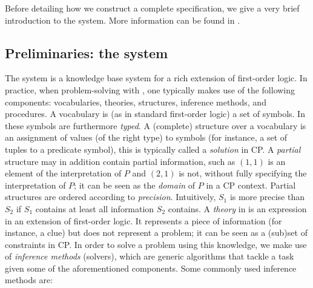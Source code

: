 Before detailing how we construct a complete specification, we give a very brief introduction to the \idp system. More information can be found in . 
\subsection{Preliminaries: the \idp system} 
The \idp system  is a knowledge base system  for a rich extension of first-order logic. 
In practice, when problem-solving with \idp, one typically makes use of the following components: vocabularies, theories, structures, inference methods, and procedures.
A vocabulary is (as in standard first-order logic) a set of symbols. In \idp these symbols are furthermore \emph{typed}. 
A (complete) structure over a vocabulary is an assignment of values (of the right type) to symbols (for instance, a set of tuples to a predicate symbol), this is typically called a \textit{solution} in CP. A \emph{partial} structure may in addition contain partial information, such as $(1,1)$ is an element of the interpretation of $P$ and $(2,1)$ is not, without fully specifying the interpretation of $P$; it can be seen as the \textit{domain} of $P$ in a CP context. 
Partial structures are ordered according to \emph{precision}. Intuitively, $S_1$ is more precise than $S_2$ if $S_1$ contains at least all information $S_2$ contains. 
A \emph{theory} in \idp is an expression in an extension of first-order logic. It represents a piece of information (for instance, a clue) but does not represent a problem; it can be seen as a (sub)set of constraints in CP. 
In order to solve a problem using this knowledge, we make use of \emph{inference methods} (solvers), which are generic algorithms that tackle a task given some of the aforementioned components. Some commonly used inference methods are:
